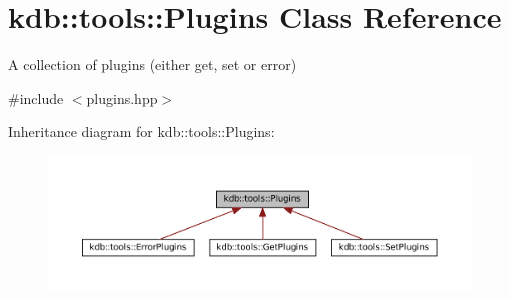 \hypertarget{classkdb_1_1tools_1_1Plugins}{}\section{kdb\+::tools\+::Plugins Class Reference}
\label{classkdb_1_1tools_1_1Plugins}


A collection of plugins (either get, set or error)  




{\ttfamily \#include $<$plugins.\+hpp$>$}



Inheritance diagram for kdb\+::tools\+::Plugins\+:
\nopagebreak
\begin{figure}[H]
\begin{center}
\leavevmode
\includegraphics[width=350pt]{classkdb_1_1tools_1_1Plugins__inherit__graph}
\end{center}
\end{figure}
